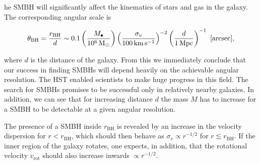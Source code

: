 \documentclass[a4paper,11pt]{article}
\begin{document}
{\noindent}he SMBH will significantly affect the kinematics of stars and gas in the galaxy. The corresponding angular scale is

\begin{align*}
    \theta_\mathrm{BH} = \frac{r_\mathrm{BH}}{d} \sim 0.1\left(\frac{M_\bullet}{10^6\,{\rm M_\odot}}\right) \left(\frac{\sigma_v}{100\,{\rm km\,s^{-1}}}\right)^{-2} \left(\frac{d}{1\,{\rm Mpc}}\right)^{-1} ~ [{\rm arcsec}],
\end{align*}

{\noindent}where $d$ is the distance of the galaxy. From this we immediately conclude that our success in finding SMBHs will depend heavily on the achievable angular resolution. The HST enabled scientists to make huge progress in this field. The search for SMBHs promises to be successful only in relatively nearby galaxies. In addition, we can see that for increasing distance $d$ the mass $M$  has to increase for a SMBH to be detectable at a given angular resolution.

{\noindent}The presence of a SMBH inside $r_\mathrm{BH}$ is revealed by an increase in the velocity dispersion for $r<r_\mathrm{BH}$, which should then behave as  $\sigma_v\propto r^{-1/2}$ for $r\lesssim r_\mathrm{BH}$. If the inner region of the galaxy rotates, one expects, in addition, that the rotational velocity $v_\mathrm{rot}$ should also increase inwards $\propto r^{-1/2}$.
\end{document}

